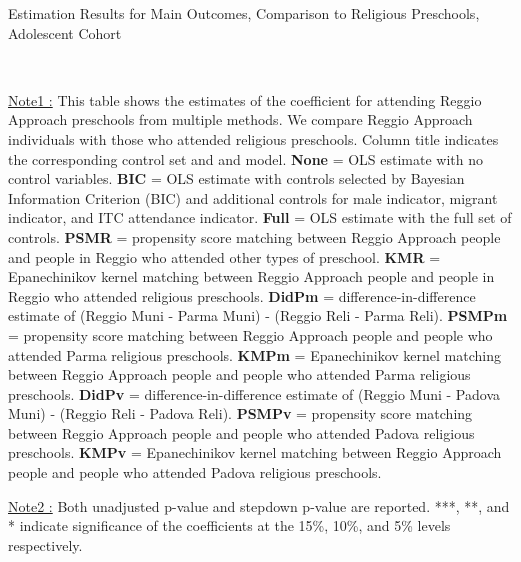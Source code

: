 \begin{table}[H] \caption{Estimation Results for Main Outcomes, Comparison to Religious Preschools, Adolescent Cohort} \label{ols-M-adol-reg-reli}
\scalebox{0.59}{}
\vspace{1ex} \\
\footnotesize\raggedright{\underline{Note1 :} This table shows the estimates of the coefficient for attending Reggio Approach preschools from multiple methods. We compare Reggio Approach individuals with those who attended religious preschools. Column title indicates the corresponding control set and and model. \textbf{None} = OLS estimate with no control variables. \textbf{BIC} = OLS estimate with controls selected by Bayesian Information Criterion (BIC) and additional controls for male indicator, migrant indicator, and ITC attendance indicator. \textbf{Full} = OLS estimate with the full set of controls. \textbf{PSMR} =  propensity score matching between Reggio Approach people and people in Reggio who attended other types of preschool. \textbf{KMR} = Epanechinikov kernel matching between Reggio Approach people and people in Reggio who attended religious preschools. \textbf{DidPm} = difference-in-difference estimate of (Reggio Muni - Parma Muni) - (Reggio Reli - Parma Reli). \textbf{PSMPm} = propensity score matching between Reggio Approach people and people who attended Parma religious preschools. \textbf{KMPm} = Epanechinikov kernel matching between Reggio Approach people and people who attended Parma religious preschools. \textbf{DidPv} = difference-in-difference estimate of (Reggio Muni - Padova Muni) - (Reggio Reli - Padova Reli). \textbf{PSMPv} = propensity score matching between Reggio Approach people and people who attended Padova religious preschools. \textbf{KMPv} = Epanechinikov kernel matching between Reggio Approach people and people who attended Padova religious preschools.} 

\footnotesize\raggedright{\underline{Note2 :} Both unadjusted p-value and stepdown p-value are reported. ***, **, and * indicate significance of the coefficients at the 15\%, 10\%, and 5\% levels respectively.}

\end{table}

